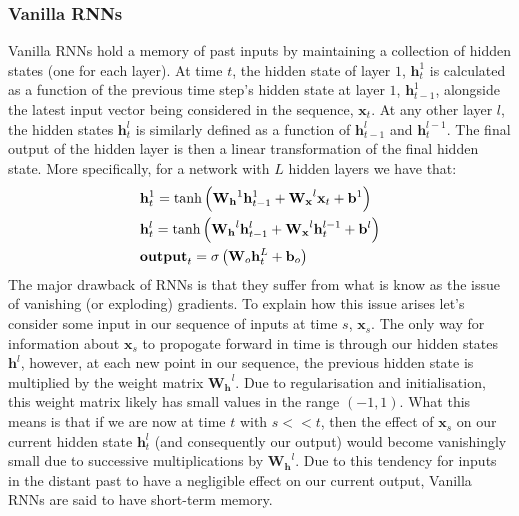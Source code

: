 \documentclass{article}
\theoremstyle{definition}
\begin{document}
\subsubsection{Vanilla RNNs}
Vanilla RNNs hold a memory of past inputs by maintaining a collection of hidden states (one for each layer). At time $t$, the hidden state of layer $1$, $\mathbf{h}_t^1$ is calculated as a function of the previous time step's hidden state at layer $1$, $\mathbf{h}_{t-1}^1$, alongside the latest input vector being considered in the sequence, $\mathbf{x}_t$. At any other layer $l$, the hidden states $\mathbf{h}_t^l$ is similarly defined as a function of $\mathbf{h}_{t-1}^l$ and $\mathbf{h}_t^{l-1}$. The final output of the hidden layer is then a linear transformation of the final hidden state. More specifically, for a network with $L$ hidden layers we have that:
\begin{align}
    &\mathbf{h}_t^1 = \text{tanh}\left(\mathbf{W_h}^1 \mathbf{h}_{t-1}^1 + \mathbf{W_x}^l \mathbf{x}_t + \mathbf{b}^1\right)\\
    &\mathbf{h}_t^l = \text{tanh}\left(\mathbf{W_h}^l \mathbf{h}_{t-1}^l + \mathbf{W_x}^l \mathbf{h}_t^{l-1} + \mathbf{b}^l\right)\\
    &\textbf{\text{output}}_t = \sigma\left(\mathbf{W}_o \mathbf{h}_t^L + \mathbf{b}_o\right)
\end{align}
The major drawback of RNNs is that they suffer from what is know as the issue of vanishing (or exploding) gradients. To explain how this issue arises let's consider some input in our sequence of inputs at time $s$, $\mathbf{x}_s$. The only way for information about $\mathbf{x}_s$ to propogate forward in time is through our hidden states $\mathbf{h}^l$, however, at each new point in our sequence, the previous hidden state is multiplied by the weight matrix $\mathbf{W_h}^l$. Due to regularisation and initialisation, this weight matrix likely has small values in the range $(-1,1)$. What this means is that if we are now at time $t$ with $s<<t$, then the effect of $\mathbf{x}_s$ on our current hidden state $\mathbf{h}_t^l$ (and consequently our output) would become vanishingly small due to successive multiplications by $\mathbf{W_h}^l$. Due to this tendency for inputs in the distant past to have a negligible effect on our current output, Vanilla RNNs are said to have short-term memory.
\end{document}
